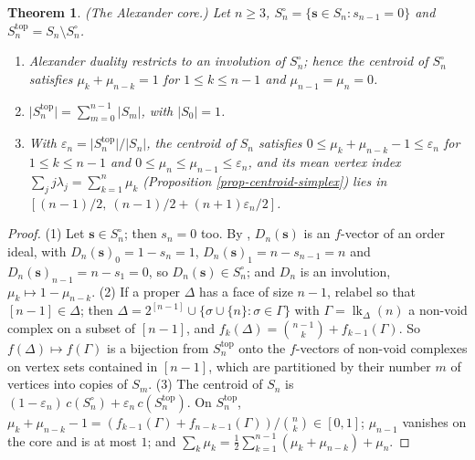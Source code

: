 \documentclass[11pt, a4paper, abstract=yes]{scrartcl}
\theoremstyle{definition}
\theoremstyle{remark}
\theoremstyle{plain}
\newtheorem{theorem}[definition]{Theorem}
\newcommand{\vek}[1]{\boldsymbol{#1}}
\theoremstyle{remark}
\theoremstyle{plain}
\newcommand{\leandiscof}[1]{\tikz[baseline=-0.6ex]\fill[#1] (0,0) circle (0.6ex);}
\newcommand{\leanfull}{\leandiscof{leanfull}}
\newcommand{\leanmark}[1]{\leavevmode{\reversemarginpar\marginnote{\raggedleft#1}}}
\let\autocite\cite
\begin{document}
\begin{theorem}
\leanmark{\leanfull}(\emph{The Alexander core.}) Let \(n\ge3\), \(S_n^\circ=\lbrace\vek s\in S_n:s_{n-1}=0\rbrace\) and
\(S_n^{\mathrm{top}}=S_n\setminus S_n^\circ\).
\begin{enumerate}
\item Alexander duality restricts to an involution of \(S_n^\circ\); hence the centroid of \(S_n^\circ\)
satisfies \(\mu_k+\mu_{n-k}=1\) for \(1\le k\le n-1\) and \(\mu_{n-1}=\mu_n=0\).
\item \(\lvert S_n^{\mathrm{top}}\rvert=\sum_{m=0}^{n-1}\lvert S_m\rvert\), with \(\lvert S_0\rvert=1\).
\item With \(\varepsilon_n=\lvert S_n^{\mathrm{top}}\rvert/\lvert S_n\rvert\), the centroid of \(S_n\)
satisfies \(0\le\mu_k+\mu_{n-k}-1\le\varepsilon_n\) for \(1\le k\le n-1\) and
\(0\le\mu_n\le\mu_{n-1}\le\varepsilon_n\), and its mean vertex index
\(\sum_jj\lambda_j=\sum_{k=1}^n\mu_k\) (Proposition \ref{prop-centroid-simplex}) lies in
\([(n-1)/2,\ (n-1)/2+(n+1)\varepsilon_n/2]\).
\end{enumerate}
\label{thm-alexander-core}
\end{theorem}

\begin{proof}
(1) Let \(\vek s\in S_n^\circ\); then \(s_n=0\) too. By \autocite[Lemma 14]{SnellmanArticle2},
\(D_n(\vek s)\) is an \(f\)-vector of an order ideal, with \(D_n(\vek s)_0=1-s_n=1\),
\(D_n(\vek s)_1=n-s_{n-1}=n\) and \(D_n(\vek s)_{n-1}=n-s_1=0\), so \(D_n(\vek s)\in S_n^\circ\); and \(D_n\)
is an involution, \(\mu_k\mapsto1-\mu_{n-k}\). (2) If a proper \(\Delta\) has a face of size \(n-1\),
relabel so that \([n-1]\in\Delta\); then \(\Delta=2^{[n-1]}\cup\lbrace\sigma\cup\lbrace n\rbrace:\sigma\in\Gamma\rbrace\)
with \(\Gamma=\operatorname{lk}_\Delta(n)\) a non-void complex on a subset of \([n-1]\), and
\(f_k(\Delta)=\binom{n-1}k+f_{k-1}(\Gamma)\). So \(f(\Delta)\mapsto f(\Gamma)\) is a bijection from
\(S_n^{\mathrm{top}}\) onto the \(f\)-vectors of non-void complexes on vertex sets contained in
\([n-1]\), which are partitioned by their number \(m\) of vertices into copies of \(S_m\). (3) The
centroid of \(S_n\) is \((1-\varepsilon_n)\,c(S_n^\circ)+\varepsilon_n\,c(S_n^{\mathrm{top}})\). On
\(S_n^{\mathrm{top}}\), \(\mu_k+\mu_{n-k}-1=(f_{k-1}(\Gamma)+f_{n-k-1}(\Gamma))/\binom nk\in[0,1]\);
\(\mu_{n-1}\) vanishes on the core and is at most \(1\); and
\(\sum_k\mu_k=\tfrac12\sum_{k=1}^{n-1}(\mu_k+\mu_{n-k})+\mu_n\).
\end{proof}
\end{document}
